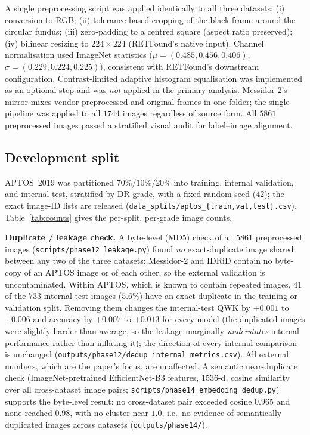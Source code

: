 \documentclass[journal]{IEEEtran}
\begin{document}
A single preprocessing script was applied identically to all three datasets:
(i) conversion to RGB; (ii) tolerance-based cropping of the black frame around the
circular fundus; (iii) zero-padding to a centred square (aspect ratio preserved);
(iv) bilinear resizing to $224\times224$ (RETFound's native input). Channel
normalisation used ImageNet statistics
($\mu=(0.485,0.456,0.406)$, $\sigma=(0.229,0.224,0.225)$), consistent with
RETFound's downstream configuration. Contrast-limited adaptive histogram
equalisation was implemented as an optional step and was \emph{not} applied in the
primary analysis. Messidor-2's mirror mixes vendor-preprocessed and original
frames in one folder; the single pipeline was applied to all $1744$ images
regardless of source form. All $5861$ preprocessed images passed a stratified
visual audit for label--image alignment.

\subsection{Development split}
\label{sec:methods-split}

APTOS~2019 was partitioned $70\%/10\%/20\%$ into training, internal validation,
and internal test, stratified by DR grade, with a fixed random seed ($42$); the
exact image-ID lists are released
(\texttt{data\_splits/aptos\_\{train,val,test\}.csv}). Table~\ref{tab:counts}
gives the per-split, per-grade image counts.

\textbf{Duplicate / leakage check.} A byte-level (MD5) check of all $5861$
preprocessed images (\texttt{scripts/phase12\_leakage.py}) found \emph{no}
exact-duplicate image shared between any two of the three datasets: Messidor-2 and
IDRiD contain no byte-copy of an APTOS image or of each other, so the external
validation is uncontaminated. Within APTOS, which is known to contain repeated
images, $41$ of the $733$ internal-test images ($5.6\%$) have an exact duplicate
in the training or validation split. Removing them changes the internal-test QWK
by $+0.001$ to $+0.006$ and accuracy by $+0.007$ to $+0.013$ for every model (the
duplicated images were slightly harder than average, so the leakage marginally
\emph{understates} internal performance rather than inflating it); the direction
of every internal comparison is unchanged
(\texttt{outputs/phase12/dedup\_internal\_metrics.csv}). All external numbers,
which are the paper's focus, are unaffected. A semantic near-duplicate check
(ImageNet-pretrained EfficientNet-B3 features, $1536$-d, cosine similarity over
all cross-dataset image pairs; \texttt{scripts/phase14\_embedding\_dedup.py})
supports the byte-level result: no cross-dataset pair exceeded cosine $0.965$ and
none reached $0.98$, with no cluster near $1.0$, i.e.\ no evidence of
semantically duplicated images across datasets
(\texttt{outputs/phase14/}).
\end{document}
